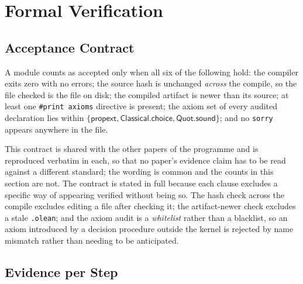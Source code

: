 \documentclass[conference]{IEEEtran}
\theoremstyle{definition}
\begin{document}
\section{Formal Verification}
\label{sec:verification}

\subsection{Acceptance Contract}

A module counts as accepted only when all six of the following hold: the compiler exits zero
with no errors; the source hash is unchanged \emph{across} the compile, so the file checked is
the file on disk; the compiled artifact is newer than its source; at least one
\texttt{\#print axioms} directive is present; the axiom set of every audited declaration lies
within $\{\textsf{propext},\textsf{Classical.choice},\textsf{Quot.sound}\}$; and no
\texttt{sorry} appears anywhere in the file.

This contract is shared with the other papers of the programme and is reproduced verbatim in
each, so that no paper's evidence claim has to be read against a different standard; the
wording is common and the counts in this section are not. The contract is stated in full
because each clause excludes a specific way of appearing verified without being so. The hash check across the compile excludes editing a file after
checking it; the artifact-newer check excludes a stale \texttt{.olean}; and the axiom audit is
a \emph{whitelist} rather than a blacklist, so an axiom introduced by a decision procedure
outside the kernel is rejected by name mismatch rather than needing to be anticipated.

\subsection{Evidence per Step}
\end{document}
